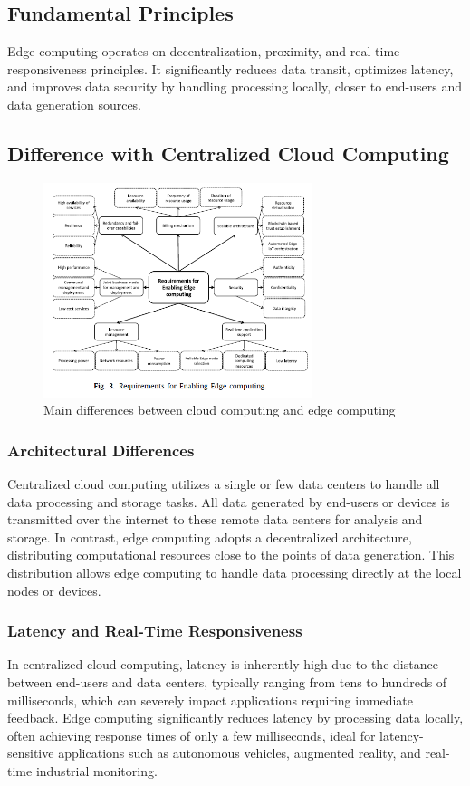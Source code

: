 \documentclass[runningheads]{llncs}
\begin{document}
\subsection{Fundamental Principles}
Edge computing operates on decentralization, proximity, and real-time responsiveness principles. It significantly reduces data transit, optimizes latency, and improves data security by handling processing locally, closer to end-users and data generation sources.

\subsection{Difference with Centralized Cloud Computing}

\begin{figure}[ht]
    \centering
    \includegraphics[width=0.7\textwidth]{IMG/2.png}
    \caption{Main differences between cloud computing and edge computing}
    \label{fig:cloud_vs_edge}
    \end{figure}

\subsubsection{Architectural Differences}
Centralized cloud computing utilizes a single or few data centers to handle all data processing and storage tasks. All data generated by end-users or devices is transmitted over the internet to these remote data centers for analysis and storage. In contrast, edge computing adopts a decentralized architecture, distributing computational resources close to the points of data generation. This distribution allows edge computing to handle data processing directly at the local nodes or devices.

\subsubsection{Latency and Real-Time Responsiveness}
In centralized cloud computing, latency is inherently high due to the distance between end-users and data centers, typically ranging from tens to hundreds of milliseconds, which can severely impact applications requiring immediate feedback. Edge computing significantly reduces latency by processing data locally, often achieving response times of only a few milliseconds, ideal for latency-sensitive applications such as autonomous vehicles, augmented reality, and real-time industrial monitoring.
\end{document}

